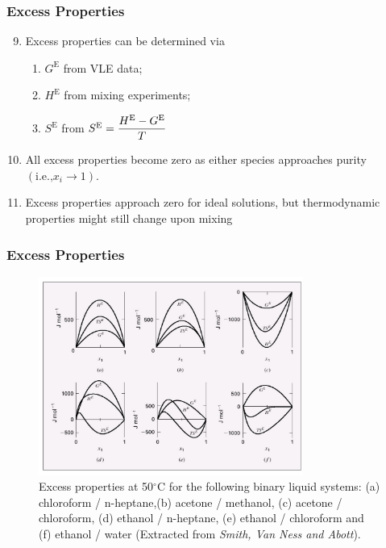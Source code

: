 \documentclass[10pt,compress,handout,ignorenonframetext,unknownkeysallowed]{beamer}
\begin{document}
\begin{frame}
  \frametitle{Excess Properties}
  \begin{enumerate}\setcounter{enumi}{8}
      \item<1-> Excess properties can be determined via
         \begin{enumerate}
            \item<1-> $G^{\text{E}}$ from VLE data;
            \item<1-> $H^{\text{E}}$ from mixing experiments;
            \item<1-> $S^{\text{E}}$ from $S^{\text{E}}=\displaystyle\frac{H^{\text{E}}-G^{\text{E}}}{T}$
         \end{enumerate}
      \item<2-> All excess properties become zero as either species approaches purity $\left(\text{i.e.,} x_{i}\rightarrow 1\right)$.
      \item<3-> Excess properties approach zero for ideal solutions, but thermodynamic properties might still change upon mixing
  \end{enumerate}
\end{frame}
\normalsize

\scriptsize
\begin{frame} 
  \frametitle{Excess Properties}
     \begin{center}
       \begin{figure}
         \includegraphics[width=9.cm, height=6.5cm,clip]{../Pics/ExcessProperties_Plot}
          \caption{\scriptsize Excess properties at 50$^{\circ}$C for the following binary liquid systems: (a) chloroform / n-heptane,(b) acetone / methanol, (c) acetone / chloroform, (d) ethanol / n-heptane, (e) ethanol / chloroform and (f) ethanol / water (Extracted from {\it Smith, Van Ness and Abott}). }
       \end{figure}
     \end{center}
\end{frame}
\normalsize
\end{document}
